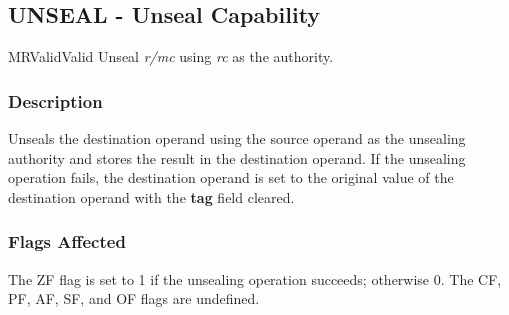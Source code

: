 \clearpage
{}
{}
\subsection*{UNSEAL - Unseal Capability}

\begin{x86opcodetable}
  {MR}{Valid}{Valid}
  {Unseal \emph{r/mc} using \emph{rc} as the authority.}
\end{x86opcodetable}

\begin{x86opentable}
\end{x86opentable}

\subsubsection*{Description}

Unseals the destination operand using the source operand as the
unsealing authority and stores the result in the destination operand.
If the unsealing operation fails, the destination operand is set to
the original value of the destination operand with the \textbf{tag}
field cleared.

\subsubsection*{Flags Affected}

The ZF flag is set to 1 if the unsealing operation succeeds; otherwise
0.  The CF, PF, AF, SF, and OF flags are undefined.
